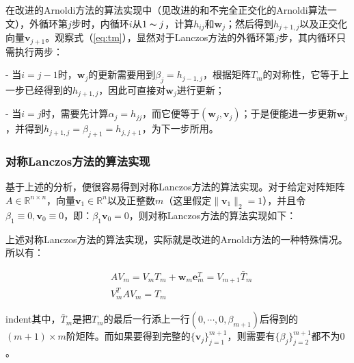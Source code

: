 \documentclass[UTF8,nofonts]{ctexart}
\begin{document}
在改进的Arnoldi方法的算法实现中（见改进的和不完全正交化的Arnoldi算法一文），外循环第$j$步时，内循环$i$从$1\thicksim j$，计算$h_{ij}$和$\boldsymbol{w}_j$；然后得到$h_{j+1,j}$以及正交化向量$\boldsymbol{v}_{j+1}$。观察式（\ref{eq:tm}），显然对于Lanczos方法的外循环第$j$步，其内循环只需执行两步：

- 当$i=j-1$时，$\boldsymbol{w}_j$的更新需要用到$\beta_j=h_{j-1,j}$，根据矩阵$T_m$的对称性，它等于上一步已经得到的$h_{j+1,j}$，因此可直接对$\boldsymbol{w}_j$进行更新；

- 当$i=j$时，需要先计算$\alpha_j=h_{jj}$，而它便等于$(\boldsymbol{w}_j,\boldsymbol{v}_j)$；于是便能进一步更新$\boldsymbol{w}_j$，并得到$h_{j+1,j}=\beta_{j+1}=h_{j,j+1}$，为下一步所用。

\subsubsection*{对称Lanczos方法的算法实现}

基于上述的分析，便很容易得到对称Lanczos方法的算法实现。对于给定对阵矩阵$A\in\mathbb{R}^{n \times n}$，向量$\boldsymbol{v}_1\in\mathbb{R}^n$以及正整数$m$（这里假定$\|\boldsymbol{v}_1\|_2=1$），并且令$\beta_1\equiv0,\boldsymbol{v}_0\equiv0$，即：$\beta_1\boldsymbol{v}_0=0$，则对称Lanczos方法的算法实现如下：

\begin{algorithm}[H]
\end{algorithm}

上述对称Lanczos方法的算法实现，实际就是改进的Arnoldi方法的一种特殊情况。所以有：

\begin{eqnarray*}
& AV_m=V_mT_m+\boldsymbol{w}_m\boldsymbol{e}_m^T=V_{m+1}\bar{T}_m \\
& V_m^TAV_m=T_m
\end{eqnarray*}

indent其中，$\bar{T}_m$是把$T_m$的最后一行添上一行$(0,\cdots,0,\beta_{m+1})$后得到的$(m+1)\times m$阶矩阵。而如果要得到完整的$\{\boldsymbol{v}_j\}_{j=1}^{m+1}$，则需要有$\{\beta_j\}_{j=2}^{m+1}$都不为$0$。
\end{document}
